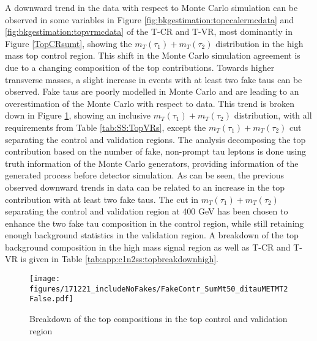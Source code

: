A downward trend in the data with respect to Monte Carlo simulation can be observed in some variables in Figure \ref{fig:bkgestimation:topccalermcdata} and \ref{fig:bkgestimation:topvrmcdata} of the T-CR and T-VR,  most dominantly in Figure \ref{TopCRsumt},  showing the $m_T(\tau_1)+m_T(\tau_2)$ distribution in the high mass top control region.
This shift in the Monte Carlo simulation agreement is due to a changing composition of the top contributions.  Towards higher transverse masses,  a slight increase in events with at least two fake taus can be observed.  Fake taus are poorly modelled in Monte Carlo and are leading to an overestimation of the Monte Carlo with respect to data. 
This trend is broken down in Figure \ref{fig:analysis:TopCRVRmtsum}, showing an inclusive $m_T(\tau_1)+m_T(\tau_2)$ distribution,  with all requirements from Table \ref{tab:SS:TopVRs},  except the $m_T(\tau_1)+m_T(\tau_2)$ cut separating the control and validation regions.
The analysis decomposing the top contribution based on the number of fake,  non-prompt tau leptons is done using truth information of the Monte Carlo generators, providing information of the generated process before detector simulation.
As can be seen,  the previous observed downward trends in data can be related to an increase in the top contribution with at least two fake taus. 
The cut in $m_T(\tau_1)+m_T(\tau_2)$ separating the control and validation region at 400 GeV has been chosen to enhance the two fake tau composition in the control region,  while still retaining enough background statistics in the validation region.  A breakdown of the top background composition in the high mass signal region as well as T-CR and T-VR is given in Table \ref{tab:app:c1n2ss:topbreakdownhigh}. 

\begin{figure}
\centering
\texttt{[image: figures/171221\_includeNoFakes/FakeContr\_SumMt50\_ditauMETMT2False.pdf]}
\caption{Breakdown of the top compositions in the top control and validation region \label{fig:analysis:TopCRVRmtsum}}
\end{figure}

